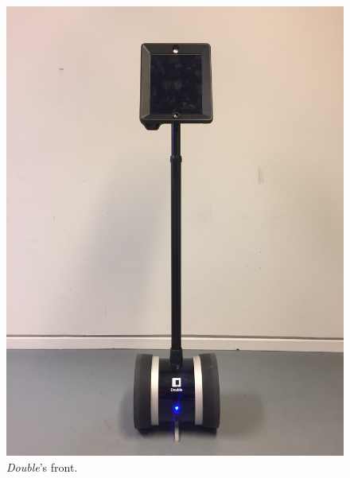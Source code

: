 \begin{figure}[H]
\centering
\begin{minipage}{.25\textwidth}
  \centering
  \includegraphics[width=\linewidth, angle =-90]{Figure/ModificeretDoubleFront}
  \caption{\textit{Double}'s front.}
  \label{fig:ModificeretDoubleFront}
\end{minipage}%
\begin{minipage}{.25\textwidth}
  \centering

\end{minipage}
\end{figure}

